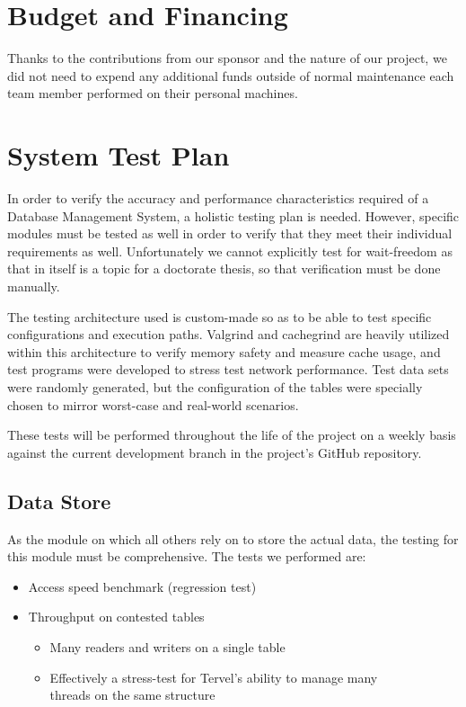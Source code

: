 \documentclass[letterpaper, 11pt]{article}
\begin{document}
\section{Budget and Financing}
Thanks to the contributions from our sponsor and the nature of our project, we did not need to expend
any additional funds outside of normal maintenance each team member performed on their personal
machines.
\newpage

\section{System Test Plan}
In order to verify the accuracy and performance characteristics required of a Database Management System,
a holistic testing plan is needed. However, specific modules must be tested as well in order to 
verify that they meet their individual requirements as well. Unfortunately we cannot explicitly test
for wait-freedom as that in itself is a topic for a doctorate thesis, so that verification must
be done manually.
\par\vspace{\baselineskip}
The testing architecture used is custom-made so as to be able to test specific configurations and 
execution paths. Valgrind and cachegrind are heavily utilized within this architecture  to verify 
memory safety and measure cache usage, and test programs were developed to stress test network 
performance. Test data sets were randomly generated, but the configuration of the tables were
specially chosen to mirror worst-case and real-world scenarios.
\par\vspace{\baselineskip}
These tests will be performed throughout the life of the project on a weekly basis against the current
development branch in the project's GitHub repository. 

\subsection{Data Store}
As the module on which all others rely on to store the actual data, the testing for this
module must be comprehensive. The tests we performed are:
\begin{itemize}
 \item Access speed benchmark (regression test)
 \item Throughput on contested tables
 \begin{itemize}
  \item Many readers and writers on a single table
  \item Effectively a stress-test for Tervel's ability to manage many \\ threads on the same
	structure
 \end{itemize}
\end{itemize}
\end{document}
